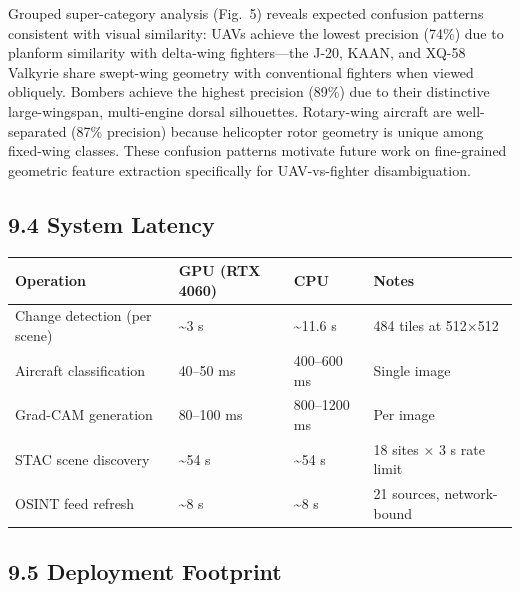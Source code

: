 \documentclass[11pt,a4paper]{article}
\begin{document}
Grouped super-category analysis (Fig.~5) reveals expected confusion patterns consistent with visual similarity: UAVs achieve the lowest precision (74\%) due to planform similarity with delta-wing fighters---the J-20, KAAN, and XQ-58 Valkyrie share swept-wing geometry with conventional fighters when viewed obliquely. Bombers achieve the highest precision (89\%) due to their distinctive large-wingspan, multi-engine dorsal silhouettes. Rotary-wing aircraft are well-separated (87\% precision) because helicopter rotor geometry is unique among fixed-wing classes. These confusion patterns motivate future work on fine-grained geometric feature extraction specifically for UAV-vs-fighter disambiguation.

\hypertarget{system-latency}{%
\subsection{9.4 System Latency}\label{system-latency}}

\begin{longtable}[]{@{}llll@{}}
\toprule\noalign{}
Operation & GPU (RTX 4060) & CPU & Notes \\
\midrule\noalign{}
\endhead
\bottomrule\noalign{}
\endlastfoot
Change detection (per scene) & \textasciitilde3 s & \textasciitilde11.6 s & 484 tiles at 512×512 \\
Aircraft classification & 40--50 ms & 400--600 ms & Single image \\
Grad-CAM generation & 80--100 ms & 800--1200 ms & Per image \\
STAC scene discovery & \textasciitilde54 s & \textasciitilde54 s & 18 sites × 3 s rate limit \\
OSINT feed refresh & \textasciitilde8 s & \textasciitilde8 s & 21 sources, network-bound \\
\end{longtable}

\hypertarget{deployment-footprint}{%
\subsection{9.5 Deployment Footprint}\label{deployment-footprint}}
\end{document}
